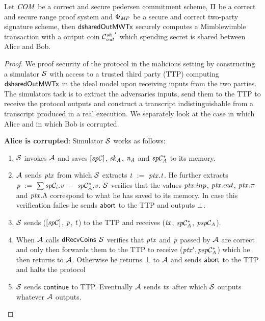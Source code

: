 \begin{theorem}\label{teo:atom:sec-sharedout-tx}
    Let $\mathit{COM}$ be a correct and secure pedersen commitment scheme, $\Pi$ be a correct and secure range proof system and $\Phi_{\mathit{MP}}$ be a secure and correct two-party signature scheme, then $\mathsf{dsharedOutMWTx}$ securely computes a Mimblewimble transaction with a output coin ${\mathcal{C}_{\mathit{out}}^{\mathit{sh}}}'$ which spending secret is shared between Alice and Bob.
\end{theorem}

\begin{proof}
    We proof security of the protocol in the malicious setting by constructing a simulator $\mathcal{S}$ with access to a trusted third party (TTP) computing $\mathsf{dsharedOutMWTx}$ in the ideal model upon receiving inputs from the two parties.
    The simulators task is to extract the adversaries inputs, send them to the TTP to receive the protocol outputs and construct a transcript indistinguishable from a transcript produced in a real execution.
    We separately look at the case in which Alice and in which Bob is corrupted.

    \textbf{Alice is corrupted}: Simulator $\mathcal{S}$ works as follows:
    \begin{enumerate}
        \item $\mathcal{S}$ invokes $\mathcal{A}$ and saves $[\mathit{sp}\mathcal{C}]$, $\mathit{sk}_{\mathit{A}}$, $\mathit{\mathit{n}_{\mathit{A}}}$ and $\mathit{sp}\mathcal{C}_{\mathit{A}}^*$ to its memory.
        \item $\mathcal{A}$ sends $\mathit{ptx}$ from which $\mathcal{S}$ extracts $\mathit{t} ~:=~ \mathit{ptx}.\mathit{t}$.
        He further extracts $\mathit{p} ~:=~ \sum\mathit{sp}\mathcal{C}_i.\mathit{v} ~-~ \mathit{sp}\mathcal{C}_{\mathit{A}}^*.\mathit{v}$.
        $\mathcal{S}$ verifies that the values $\mathit{ptx}.inp$, $\mathit{ptx}.out$, $\mathit{ptx}.\pi$ and $\mathit{ptx}.\Lambda$ correspond to what he has saved to its memory.
        In case this verification failes he sends $\mathsf{abort}$ to the TTP and outputs $\bot$.
        \item $\mathcal{S}$ sends ($[\mathit{sp}\mathcal{C}]$, $\mathit{p}$, $\mathit{t}$) to the TTP and receives ($\mathit{tx}$, $\mathit{sp}\mathcal{C}_{\mathit{A}}^*$, $\mathit{psp}\mathcal{C}_{\mathit{A}}$).
        \item When $\mathcal{A}$ calls $\mathsf{dRecvCoins}$ $\mathcal{S}$ verifies that $\mathit{ptx}$ and $\mathit{p}$ passed by $\mathcal{A}$ are correct and only then forwards them to the TTP to receive (${\mathit{ptx}}', \mathit{psp}\mathcal{C}_{\mathit{A}}^*$) which he then returns to $\mathcal{A}$.
        Otherwise he returns $\bot$ to $\mathcal{A}$ and sends $\mathsf{abort}$ to the TTP and halts the protocol
        \item $\mathcal{S}$ sends $\mathsf{continue}$ to TTP.
        Eventually $\mathcal{A}$ sends $\mathit{tx}$ after which $\mathcal{S}$ outputs whatever $\mathcal{A}$ outputs.
    \end{enumerate}


\end{proof}
